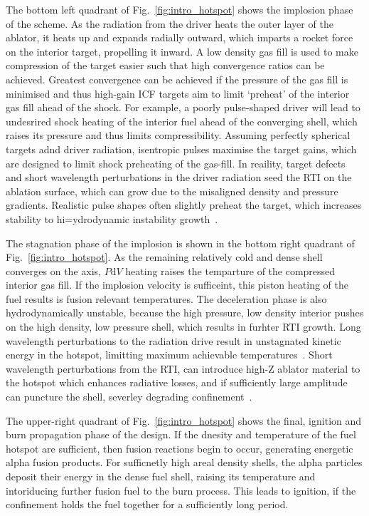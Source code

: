 The bottom left quadrant of Fig.~\ref{fig:intro_hotspot} shows the implosion phase of the scheme.
As the radiation from the driver heats the outer layer of the ablator, it heats up and expands radially outward, which imparts a rocket force on the interior target, propelling it inward.
A low density gas fill is used to make compression of the target easier such that high convergence ratios can be achieved.
Greatest convergence can be achieved if the pressure of the gas fill is minimised and thus high-gain \ac{ICF} targets aim to limit `preheat' of the interior gas fill ahead of the shock.
For example, a poorly pulse-shaped driver will lead to undesrired shock heating of the interior fuel ahead of the converging shell, which raises its pressure and thus limits compressibility.
Assuming perfectly spherical targets adnd driver radiation, isentropic pulses maximise the target gains, which are designed to limit shock preheating of the gas-fill.
In reaility, target defects and short wavelength perturbations in the driver radiation seed the \ac{RTI} on the ablation surface, which can grow due to the misaligned density and pressure gradients.
Realistic pulse shapes often slightly preheat the target, which increases stability to hi=ydrodynamic instability growth~\cite{goncharov_improved_2003,hurricane_high-foot_2014}.

The stagnation phase of the implosion is shown in the bottom right quadrant of Fig.~\ref{fig:intro_hotspot}.
As the remaining relatively cold and dense shell converges on the axis, $P\text{d}V$ heating raises the temparture of the compressed interior gas fill.
If the implosion velocity is sufficeint, this piston heating of the fuel results is fusion relevant temperatures.
The deceleration phase is also hydrodynamically unstable, because the high pressure, low density interior pushes on the high density, low pressure shell, which results in furhter \ac{RTI} growth.
Long wavelength perturbations to the radiation drive result in unstagnated kinetic energy in the hotspot, limitting maximum achievable temperatures~\cite{gatu_johnson_impact_2018}.
Short wavelength perturbations from the \ac{RTI}, can introduce high-Z ablator material to the hotspot which enhances radiative losses, and if sufficiently large amplitude can puncture the shell, severley degrading confinement~\cite{smalyuk_review_2020}.

The upper-right quadrant of Fig.~\ref{fig:intro_hotspot} shows the final, ignition and burn propagation phase of the design.
If the dnesity and temperature of the fuel hotspot are sufficient, then fusion reactions begin to occur, generating energetic alpha fusion products.
For sufficnetly high areal density shells, the alpha particles deposit their energy in the dense fuel shell, raising its temperature and intoriducing further fusion fuel to the burn process.
This leads to ignition, if the confinement holds the fuel together for a sufficiently long period.

